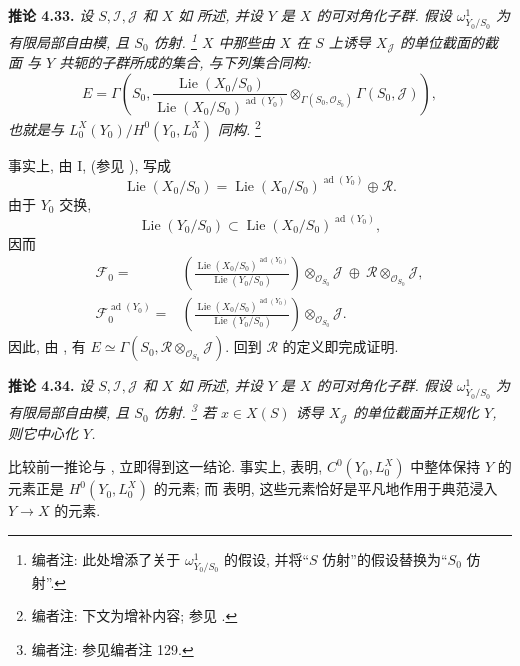 \medskip
\noindent{}\textbf{推论 4.33.}
\textit{设 \(S,\mathscr I,\mathscr J\) 和 \(X\) 如
 所述,
并设 \(Y\) 是 \(X\) 的可对角化子群.
假设 \(\omega^1_{Y_0/S_0}\) 为有限局部自由模, 且 \(S_0\) 仿射.
\footnote{编者注: 此处增添了关于 \(\omega^1_{Y_0/S_0}\) 的假设,
并将“\(S\) 仿射”的假设替换为“\(S_0\) 仿射”.}
\(X\) 中那些由 \(X\) 在 \(S\) 上诱导 \(X_{\mathscr J}\) 的单位截面的截面
与 \(Y\) 共轭的子群所成的集合, 与下列集合同构:}
\[
 E=\Gamma\!\left(
 S_0,
 \frac{\operatorname{Lie}(X_0/S_0)}
      {\operatorname{Lie}(X_0/S_0)^{\operatorname{ad}(Y_0)}}
 \otimes_{\Gamma(S_0,\mathscr O_{S_0})}\Gamma(S_0,\mathscr J)
 \right),
\]
\textit{也就是与 \(L_0^X(Y_0)/H^0(Y_0,L_0^X)\) 同构.}
\footnote{编者注: 下文为增补内容; 参见 .}

事实上, 由 I, 
(参见 ), 写成
\[
 \operatorname{Lie}(X_0/S_0)
 =\operatorname{Lie}(X_0/S_0)^{\operatorname{ad}(Y_0)}
  \oplus\mathscr R.
\]
由于 \(Y_0\) 交换,
\[
 \operatorname{Lie}(Y_0/S_0)
 \subset\operatorname{Lie}(X_0/S_0)^{\operatorname{ad}(Y_0)},
\]
因而
\[
 \begin{aligned}
 \mathscr F_0={}&
 \left(
  \frac{\operatorname{Lie}(X_0/S_0)^{\operatorname{ad}(Y_0)}}
       {\operatorname{Lie}(Y_0/S_0)}
 \right)\otimes_{\mathscr O_{S_0}}\mathscr J
 \ \oplus\ \mathscr R\otimes_{\mathscr O_{S_0}}\mathscr J,\\
 \mathscr F_0^{\operatorname{ad}(Y_0)}={}&
 \left(
  \frac{\operatorname{Lie}(X_0/S_0)^{\operatorname{ad}(Y_0)}}
       {\operatorname{Lie}(Y_0/S_0)}
 \right)\otimes_{\mathscr O_{S_0}}\mathscr J.
 \end{aligned}
\]
因此, 由 , 有
\(E\simeq
\Gamma(S_0,\mathscr R\otimes_{\mathscr O_{S_0}}\mathscr J)\).
回到 \(\mathscr R\) 的定义即完成证明.

\medskip
\noindent{}\textbf{推论 4.34.}
\textit{设 \(S,\mathscr I,\mathscr J\) 和 \(X\) 如
 所述,
并设 \(Y\) 是 \(X\) 的可对角化子群.
假设 \(\omega^1_{Y_0/S_0}\) 为有限局部自由模, 且 \(S_0\) 仿射.
\footnote{编者注: 参见编者注 129.}
若 \(x\in X(S)\) 诱导 \(X_{\mathscr J}\) 的单位截面并正规化 \(Y\),
则它中心化 \(Y\).}

比较前一推论与 , 立即得到这一结论.
事实上,  表明,
\(C^0(Y_0,L_0^X)\) 中整体保持 \(Y\) 的元素正是
\(H^0(Y_0,L_0^X)\) 的元素; 而  表明,
这些元素恰好是平凡地作用于典范浸入 \(Y\longrightarrow X\) 的元素.

